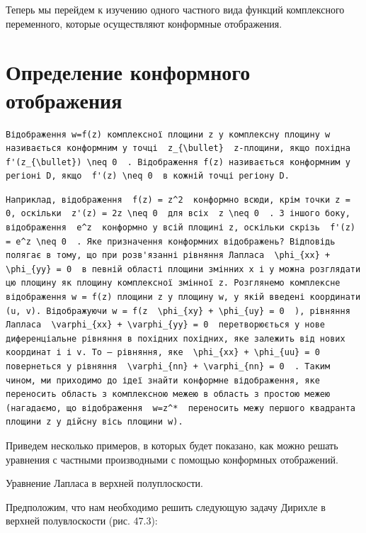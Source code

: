 \documentclass[
  ukrainian,
]{article}
\begin{document}
Теперь мы перейдем к изучению одного частного вида функций комплексного
переменного, которые осуществляют конформные отображения.

\section{Определение конформного
отображения}\label{ux43eux43fux440ux435ux434ux435ux43bux435ux43dux438ux435-ux43aux43eux43dux444ux43eux440ux43cux43dux43eux433ux43e-ux43eux442ux43eux431ux440ux430ux436ux435ux43dux438ux44f}

\begin{verbatim}
Відображення w=f(z) комплексної площини z у комплексну площину w називається конформним у точці  z_{\bullet}  z-площини, якщо похідна  f'(z_{\bullet}) \neq 0  . Відображення f(z) називається конформним у регіоні D, якщо  f'(z) \neq 0  в кожній точці регіону D.
\end{verbatim}

\begin{verbatim}
Наприклад, відображення  f(z) = z^2  конформно всюди, крім точки z = 0, оскільки  z'(z) = 2z \neq 0  для всіх  z \neq 0  . З іншого боку, відображення  e^z  конформно у всій площині z, оскільки скрізь  f'(z) = e^z \neq 0  . Яке призначення конформних відображень? Відповідь полягає в тому, що при розв'язанні рівняння Лапласа  \phi_{xx} + \phi_{yy} = 0  в певній області площини змінних x і y можна розглядати цю площину як площину комплексної змінної z. Розглянемо комплексне відображення w = f(z) площини z у площину w, у якій введені координати (u, v). Відображуючи w = f(z  \phi_{xy} + \phi_{uy} = 0  ), рівняння Лапласа  \varphi_{xx} + \varphi_{yy} = 0  перетворюється у нове диференціальне рівняння в похідних похідних, яке залежить від нових координат і і v. To — рівняння, яке  \phi_{xx} + \phi_{uu} = 0  повернеться у рівняння  \varphi_{nn} + \varphi_{nn} = 0  . Таким чином, ми приходимо до ідеї знайти конформне відображення, яке переносить область з комплексною межею в область з простою межею (нагадаємо, що відображення  w=z^*  переносить межу першого квадранта площини z у дійсну вісь площини w).
\end{verbatim}

Приведем несколько примеров, в которых будет показано, как можно решать
уравнения с частными производными с помощью конформных отображений.

Уравнение Лапласа в верхней полуплоскости.

Предположим, что нам необходимо решить следующую задачу Дирихле в
верхней полувлоскости (рис. 47.3):
\end{document}
